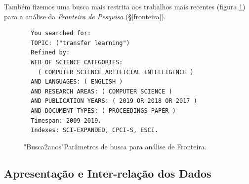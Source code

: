 \documentclass[sigconf]{acmart}
\begin{document}
Também fizemos uma busca mais restrita aos trabalhos mais recentes (figura \ref{card:sota}) para a análise da \emph{Fronteira de Pesquisa} (\S \ref{fronteira}).
\begin{figure}[htp]
  \begin{tcolorbox}[colback=yellow!5!white,colframe=gray!75!black,title={Results: 384 (from Web of Science Core Collection)}]
    \footnotesize{
  \begin{verbatim}
  You searched for: 
  TOPIC: ("transfer learning")
  Refined by: 
  WEB OF SCIENCE CATEGORIES: 
    ( COMPUTER SCIENCE ARTIFICIAL INTELLIGENCE )
  AND LANGUAGES: ( ENGLISH ) 
  AND RESEARCH AREAS: ( COMPUTER SCIENCE )
  AND PUBLICATION YEARS: ( 2019 OR 2018 OR 2017 )
  AND DOCUMENT TYPES: ( PROCEEDINGS PAPER )
  Timespan: 2009-2019. 
  Indexes: SCI-EXPANDED, CPCI-S, ESCI.
  \end{verbatim}
    }
  
  \end{tcolorbox}
  \caption{"Busca2anos"Parâmetros de busca para análise de Fronteira.}
  \label{card:sota}
\end{figure}

\subsection{Apresentação e Inter-relação dos Dados}\label{inter}

\end{document}
